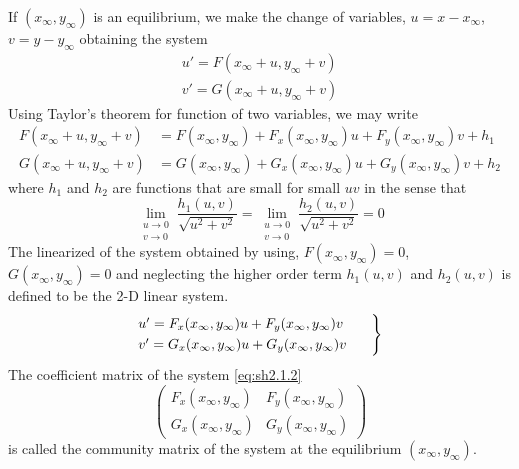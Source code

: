 \documentclass[../main-sheet.tex]{subfiles}
\begin{document}
\begin{soln}
    If \((x_\infty, y_\infty)\) is an equilibrium, we make the change of variables, \(u=x-x_\infty\), \(v=y-y_\infty\) obtaining the system
    \begin{align*}
        u'=F(x_\infty+u, y_\infty+v)\\
        v'=G(x_\infty+u, y_\infty+v)
    \end{align*}
    Using Taylor's theorem for function of two variables, we may write
    \begin{align*}
        F(x_\infty+u, y_\infty+v)&=F(x_\infty, y_\infty)+F_x(x_\infty, y_\infty)u+F_y(x_\infty, y_\infty)v+h_1\\
        G(x_\infty+u, y_\infty+v)&=G(x_\infty, y_\infty)+G_x(x_\infty, y_\infty)u+G_y(x_\infty, y_\infty)v+h_2
    \end{align*}
    where \(h_1 \) and  \(h_2\) are functions that are small for small \(uv\) in the sense that
    \[
        \lim_{\substack{u\to0\\ v\to0}}\frac{h_1(u,v)}{\sqrt{u^2+v^2}}=\lim_{\substack{u\to0\\ v\to0}}\frac{h_2(u,v)}{\sqrt{u^2+v^2}}=0
        \]
    The linearized of the system obtained by using, \(F(x_\infty, y_\infty)=0\), \(G(x_\infty, y_\infty)=0\) and neglecting the higher order term \(h_1(u,v)\) and \(h_2(u,v)\) is defined to be the 2-D linear system.
    \begin{equation}
        \begin{rcases}
            u'=F_x(x_\infty, y_\infty)u+F_y(x_\infty, y_\infty)v\qquad\\
            v'=G_x(x_\infty, y_\infty)u+G_y(x_\infty, y_\infty)v
        \end{rcases}
        \label{eq:sh2.1.2}
    \end{equation}
    The coefficient matrix of the system \eqref{eq:sh2.1.2}
    \[\begin{pmatrix}
        F_x(x_\infty, y_\infty)&F_y(x_\infty, y_\infty)\\
        G_x(x_\infty, y_\infty)&G_y(x_\infty, y_\infty)
    \end{pmatrix}\]
    is called the community matrix of the system at the equilibrium \((x_\infty, y_\infty)\).\\
    

\end{soln}
\end{document}
